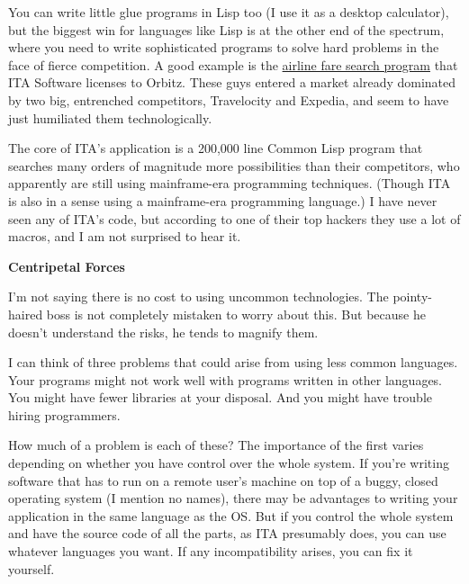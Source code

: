 You can write little glue programs in Lisp
                  too (I use it as a desktop calculator), but the biggest win
                  for languages like Lisp is at the other end of the spectrum,
                  where you need to write sophisticated programs to solve hard
                  problems in the face of fierce competition. A good example is
                  the \href{http://www.paulgraham.com/carl.html}{airline fare search program} that
                  ITA Software licenses to Orbitz. These guys entered a market
                  already dominated by two big, entrenched competitors,
                  Travelocity and Expedia, and seem to have just humiliated them
                  technologically.

The core of ITA's application is a
                  200,000 line Common Lisp program that searches many orders of
                  magnitude more possibilities than their competitors, who
                  apparently are still using mainframe-era programming
                  techniques. (Though ITA is also in a sense using a
                  mainframe-era programming language.) I have never seen any of
                  ITA's code, but according to one of their top hackers they use
                  a lot of macros, and I am not surprised to hear it.

\textbf{Centripetal Forces}

I'm not saying there is no cost to using uncommon
                  technologies. The pointy-haired boss is not completely
                  mistaken to worry about this. But because he doesn't
                  understand the risks, he tends to magnify them.

I
                  can think of three problems that could arise from using less
                  common languages. Your programs might not work well with
                  programs written in other languages. You might have fewer
                  libraries at your disposal. And you might have trouble hiring
                  programmers.

How much of a problem is each of
                  these? The importance of the first varies depending on whether
                  you have control over the whole system. If you're writing
                  software that has to run on a remote user's machine on top of
                  a buggy, closed operating system (I mention no names), there
                  may be advantages to writing your application in the same
                  language as the OS. But if you control the whole system and
                  have the source code of all the parts, as ITA presumably does,
                  you can use whatever languages you want. If any
                  incompatibility arises, you can fix it yourself.

